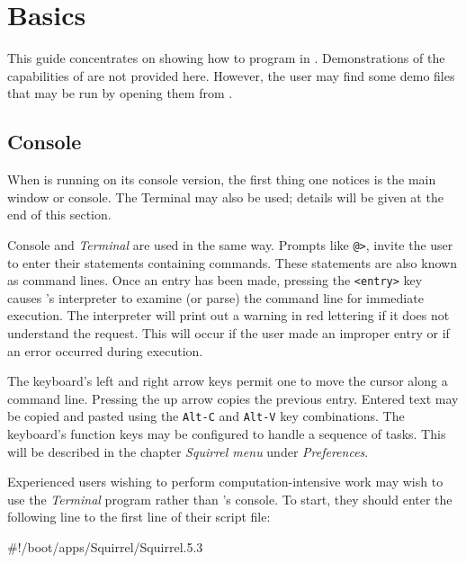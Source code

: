 \chapter{\squirrel Basics}

This guide concentrates on showing how to program in \squirrel. Demonstrations of the capabilities of \squirrel are not provided here. However, the user may find some demo files that may be run by opening them from \squirrel.

\section{Console}

When \squirrel is running on its console version, the first thing one notices is the main window or console. The \beos Terminal may also be used; details will be given at the end of this section.

\begin{center} 
\begin{figure}[h] 
\centerline{ 
} 
\end{figure} 
\end{center}
 
Console and {\em \beos Terminal} are used in the same way.  Prompts like \verb+@>+, invite the user to enter their statements containing \squirrel commands.  These statements are also known as command lines.  Once an entry has been made, pressing the \verb+<entry>+ key causes \squirrel's interpreter to examine (or parse) the command line for immediate execution.  The interpreter will print out a warning in red lettering if it does not understand the request. This will occur if the user made an improper entry or if an error occurred during execution. 
 
The keyboard's left and right arrow keys permit one to move the cursor along a command line.  Pressing the up arrow copies the previous entry.  Entered text may be copied and pasted using the {\tt Alt-C} and {\tt Alt-V} key combinations.  The keyboard's function keys may be configured to handle a sequence of tasks.  This will be described in the chapter {\em Squirrel menu} under {\em Preferences}.  
 
Experienced users wishing to perform computation-intensive work may wish to use the {\em \beos Terminal} program rather than \squirrel's console.  To start, they should enter the following line to the first line of their script file: 

\begin{verbatimtab}
#!/boot/apps/Squirrel/Squirrel.5.3 
\end{verbatimtab}

